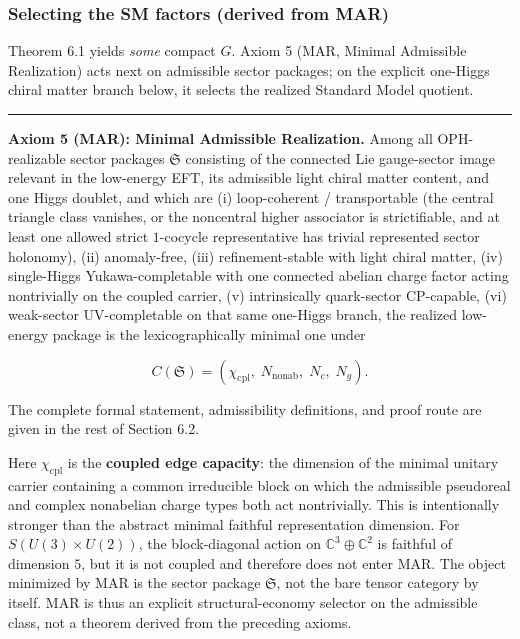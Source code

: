 \subsubsection{Selecting the SM factors (derived from MAR)}\label{62-selecting-the-sm-factors-derived-from-mar}

Theorem 6.1 yields \emph{some} compact \(G\). Axiom 5 (MAR, Minimal Admissible Realization) acts next on admissible sector packages; on the explicit one-Higgs chiral matter branch below, it selects the realized Standard Model quotient.

\begin{center}\rule{0.5\linewidth}{0.5pt}\end{center}

\textbf{Axiom 5 (MAR): Minimal Admissible Realization.} Among all OPH-realizable sector packages \(\mathfrak S\) consisting of the connected Lie gauge-sector image relevant in the low-energy EFT, its admissible light chiral matter content, and one Higgs doublet, and which are (i) loop-coherent / transportable (the central triangle class vanishes, or the noncentral higher associator is strictifiable, and at least one allowed strict \(1\)-cocycle representative has trivial represented sector holonomy), (ii) anomaly-free, (iii) refinement-stable with light chiral matter, (iv) single-Higgs Yukawa-completable with one connected abelian charge factor acting nontrivially on the coupled carrier, (v) intrinsically quark-sector CP-capable, (vi) weak-sector UV-completable on that same one-Higgs branch, the realized low-energy package is the lexicographically minimal one under

\[C(\mathfrak S) = (\chi_{\mathrm{cpl}},\; N_{\mathrm{nonab}},\; N_c,\; N_g).\]

The complete formal statement, admissibility definitions, and proof route are given in the rest of Section 6.2.

Here \(\chi_{\mathrm{cpl}}\) is the \textbf{coupled edge capacity}: the dimension of the minimal unitary carrier containing a common irreducible block on which the admissible pseudoreal and complex nonabelian charge types both act nontrivially. This is intentionally stronger than the abstract minimal faithful representation dimension. For \(S(U(3)\times U(2))\), the block-diagonal action on \(\mathbb{C}^3 \oplus \mathbb{C}^2\) is faithful of dimension \(5\), but it is not coupled and therefore does not enter MAR. The object minimized by MAR is the sector package \(\mathfrak S\), not the bare tensor category by itself. MAR is thus an explicit structural-economy selector on the admissible class, not a theorem derived from the preceding axioms.

